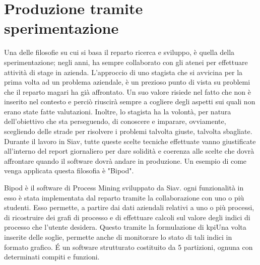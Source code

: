 \section{Produzione tramite sperimentazione}
Una delle filosofie su cui si basa il reparto ricerca e sviluppo, è quella della sperimentazione; negli anni, ha sempre collaborato con gli atenei per effettuare attività di stage in azienda. L'approccio di uno stagista che si avvicina per la prima volta ad un problema aziendale, è un prezioso punto di vista su problemi che il reparto magari ha già affrontato. Un suo valore risiede nel fatto che non è inserito nel contesto e perciò riuscirà sempre a cogliere degli aspetti sui quali non erano state fatte valutazioni. Inoltre, lo stagista ha la volontà, per natura dell'obiettivo che sta perseguendo, di conoscere e imparare, ovviamente, scegliendo delle strade per risolvere i problemi talvolta giuste, talvolta sbagliate. Durante il lavoro in Siav, tutte queste scelte tecniche effettuate vanno giustificate all'interno del report giornaliero per dare solidità e coerenza alle scelte che dovrà affrontare quando il software dovrà andare in produzione. Un esempio di come venga applicata questa filosofia è "Bipod".

Bipod è il software di Process Mining sviluppato da Siav. ogni funzionalità in esso è stata implementata dal reparto tramite la collaborazione con uno o più studenti. Esso permette, a partire dai dati aziendali relativi a uno o più processi, di ricostruire dei grafi di processo e di effettuare calcoli sul valore degli indici di processo che l'utente desidera. Questo tramite la formulazione di \acrshort{kpi}\glsfirstoccur Una volta inserite delle soglie, permette anche di monitorare lo stato di tali indici in formato grafico. \'E un software strutturato costituito da 5 partizioni, ognuna con determinati compiti e funzioni.
